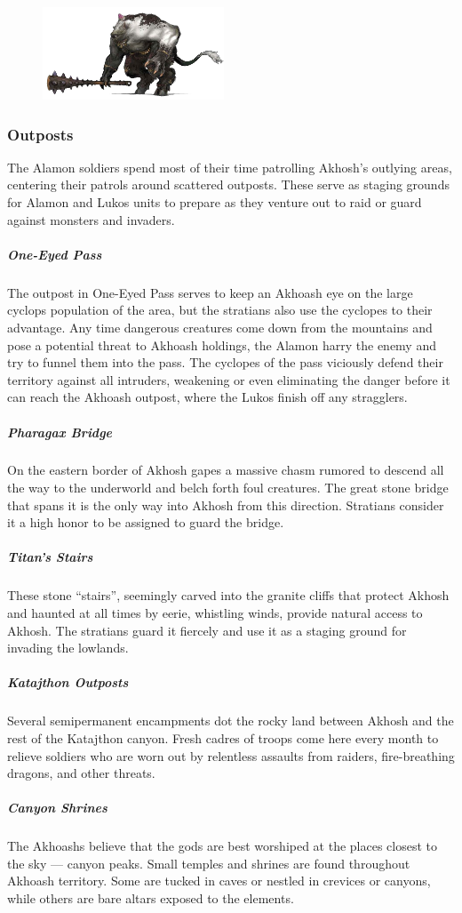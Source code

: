     \begin{figure}[!t] %
        \centering
        \includegraphics[width=0.48\textwidth]{02viphoger/img/20cyclops}
    \end{figure}

    \subsubsection{Outposts}
        The Alamon soldiers spend most of their time patrolling Akhosh's outlying areas, centering their patrols around scattered outposts.
        These serve as staging grounds for Alamon and Lukos units to prepare as they venture out to raid or guard against monsters and invaders.

        \subparagraph{One-Eyed Pass} The outpost in One-Eyed Pass serves to keep an Akhoash eye on the large cyclops population of the area, but the stratians also use the cyclopes to their advantage.
        Any time dangerous creatures come down from the mountains and pose a potential threat to Akhoash holdings, the Alamon harry the enemy and try to funnel them into the pass.
        The cyclopes of the pass viciously defend their territory against all intruders, weakening or even eliminating the danger before it can reach the Akhoash outpost, where the Lukos finish off any stragglers.

        \subparagraph{Pharagax Bridge} On the eastern border of Akhosh gapes a massive chasm rumored to descend all the way to the underworld and belch forth foul creatures.
        The great stone bridge that spans it is the only way into Akhosh from this direction.
        Stratians consider it a high honor to be assigned to guard the bridge.

        \subparagraph{Titan's Stairs} These stone ``stairs'', seemingly carved into the granite cliffs that protect Akhosh and haunted at all times by eerie, whistling winds, provide natural access to Akhosh.
        The stratians guard it fiercely and use it as a staging ground for invading the lowlands.

        \subparagraph{Katajthon Outposts} Several semipermanent encampments dot the rocky land between Akhosh and the rest of the Katajthon canyon.
        Fresh cadres of troops come here every month to relieve soldiers who are worn out by relentless assaults from raiders, fire-breathing dragons, and other threats.

        \subparagraph{Canyon Shrines} The Akhoashs believe that the gods are best worshiped at the places closest to the sky --- canyon peaks.
        Small temples and shrines are found throughout Akhoash territory.
        Some are tucked in caves or nestled in crevices or canyons, while others are bare altars exposed to the elements.

\pagebreak
